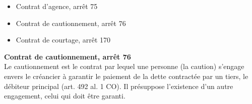 \begin{itemize}
    \item Contrat d'agence, arrêt 75
    \item Contrat de cautionnement, arrêt 76
    \item Contrat de courtage, arrêt 170
\end{itemize}

\textbf{Contrat de cautionnement, arrêt 76}\\
Le cautionnement est le contrat par lequel une personne (la caution) s’engage envers le créancier à garantir le paiement de la dette contractée par un tiers, le débiteur principal (art. 492 al. 1 CO). Il présuppose l’existence d’un autre engagement, celui qui doit être garanti.